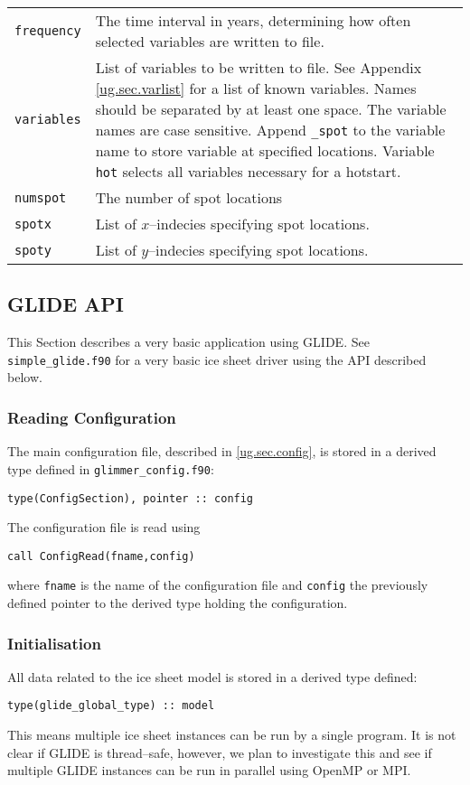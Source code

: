 \begin{center}
\begin{supertabular}{|l|p{11cm}|}
    \texttt{frequency} & The time interval in years, determining how often selected variables are written to file.\\
    \texttt{variables} & List of variables to be written to file. See Appendix \ref{ug.sec.varlist} for a list of known variables. Names should be separated by at least one space. The variable names are case sensitive. Append \texttt{\_spot} to the variable name to store variable at specified locations. Variable \texttt{hot} selects all variables necessary for a hotstart.\\
    \texttt{numspot} & The number of spot locations\\
    \texttt{spotx} & List of $x$--indecies specifying spot locations.\\
    \texttt{spoty} & List of $y$--indecies specifying spot locations.\\   
    \hline
  \end{supertabular}
\end{center}

\subsection{GLIDE API}
This Section describes a very basic application using GLIDE. See \texttt{simple\_glide.f90} for a very basic ice sheet driver using the API described below.
\subsubsection{Reading Configuration}
The main configuration file, described in \ref{ug.sec.config}, is stored in a derived type defined in \texttt{glimmer\_config.f90}:
\begin{verbatim}
type(ConfigSection), pointer :: config
\end{verbatim}
The configuration file is read using
\begin{verbatim}
call ConfigRead(fname,config)
\end{verbatim}
where \texttt{fname} is the name of the configuration file and \texttt{config} the previously defined pointer to the derived type holding the configuration.

\subsubsection{Initialisation}
All data related to the ice sheet model is stored in a derived type defined:
\begin{verbatim}
type(glide_global_type) :: model
\end{verbatim}
This means multiple ice sheet instances can be run by a single program. It is not clear if GLIDE is thread--safe, however, we plan to investigate this and see if multiple GLIDE instances can be run in parallel using OpenMP or MPI.

